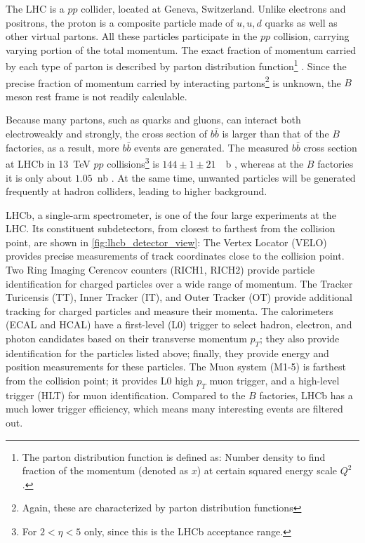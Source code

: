 The LHC is a $pp$ collider, located at Geneva, Switzerland.
Unlike electrons and positrons, the proton is a composite particle made of $u,
u, d$ quarks as well as other virtual partons.
All these particles participate in the $pp$ collision, carrying
varying portion of the total momentum.
The exact fraction of momentum carried by each type of parton is described by
parton distribution function\footnote{
    The parton distribution function is defined as:
    Number density to find fraction of the momentum (denoted as $x$) at certain
    squared energy scale $Q^2$.
} \cite{Ball:2014uwa}.
Since the precise fraction of momentum carried by interacting
partons\footnote{
    Again, these are characterized by parton distribution functions
} is unknown, the $B$ meson rest frame is not readily calculable.

Because many partons, such as quarks and gluons, can interact both
electroweakly and strongly,
the cross section of $b \bar{b}$ is larger than that of the $B$ factories, as a
result, more $b \bar{b}$ events are generated.
The measured $b \bar{b}$ cross section at LHCb in \SI{13}{TeV} $pp$ collisions\footnote{
    For $2 < \eta < 5$ only, since this is the LHCb acceptance range.
} is $144 \pm 1 \pm 21$~\si{\mu b} \cite{Aaij:2016avz}, whereas at the $B$ factories it is only
about $1.05$~\si{nb} \cite{Harrison:1998yr}.
At the same time, unwanted particles will be generated frequently at hadron
colliders, leading to higher background.


LHCb, a single-arm spectrometer, is one of the four large experiments at the
LHC.
Its constituent subdetectors, from closest to farthest from the collision point,
are shown in \autoref{fig:lhcb_detector_view}:
The Vertex Locator (VELO) provides precise measurements of track coordinates
close to the collision point.
Two Ring Imaging Cerencov counters (RICH1, RICH2) provide particle
identification for charged particles over a wide range of momentum.
The Tracker Turicensis (TT), Inner Tracker (IT), and Outer Tracker (OT) provide
additional tracking for charged particles and measure their momenta.
The calorimeters (ECAL and HCAL) have a first-level (L0) trigger to select
hadron, electron, and photon candidates based on their transverse momentum
$p_T$;
they also provide identification for the particles listed above;
finally, they provide energy and position measurements for these particles.
The Muon system (M1-5) is farthest from the collision point;
it provides L0 high $p_T$ muon trigger, and a high-level trigger (HLT) for muon
identification. Compared to the $B$ factories, LHCb has a much lower trigger efficiency, which
means many interesting events are filtered out\cite{LHCb:2008}.

